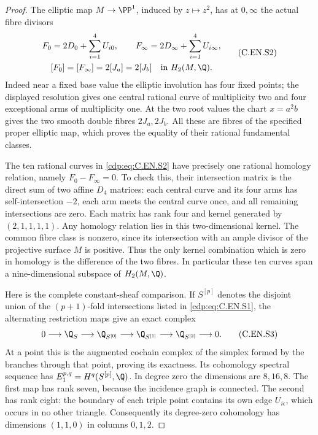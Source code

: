 \begin{proof}
The elliptic map $M\to\PP^1$, induced by $z\mapsto z^2$,
has at $0,\infty$ the actual fibre divisors
\[
 \begin{gathered}
 F_0=2D_0+\sum_{i=1}^4U_{i0},\qquad
 F_\infty=2D_\infty+\sum_{i=1}^4U_{i\infty},\\
 [F_0]=[F_\infty]=2[J_a]=2[J_b]
       \quad\text{in }H_2(M,\Q).
 \end{gathered}                                          \tag{C.EN.S2}\label{cdp:eq:C.EN.S2}
\]
Indeed near a fixed base value the elliptic involution has
four fixed points; the displayed resolution gives one central
rational curve of multiplicity two and four exceptional arms
of multiplicity one. At the two root values the chart
$x=a^2b$ gives the two smooth double fibres $2J_a,2J_b$.
All these are fibres of the specified proper elliptic map,
which proves the equality of their rational fundamental classes.

The ten rational curves in \eqref{cdp:eq:C.EN.S2} have precisely one rational
homology relation, namely $F_0-F_\infty=0$. To check this,
their intersection matrix is the direct sum of two affine
$D_4$ matrices: each central curve and its four arms has
self-intersection $-2$, each arm meets the central curve
once, and all remaining intersections are zero. Each matrix
has rank four and kernel generated by $(2,1,1,1,1)$.
Any homology relation lies in this two-dimensional kernel.
The common fibre class is nonzero, since its intersection
with an ample divisor of the projective surface $M$ is
positive. Thus the only kernel combination which is zero in
homology is the difference of the two fibres. In particular
these ten curves span a nine-dimensional subspace of
$H_2(M,\Q)$.

Here is the complete constant-sheaf comparison. If $S^{[p]}$
denotes the disjoint union of the $(p+1)$-fold intersections
listed in \eqref{cdp:eq:C.EN.S1}, the alternating restriction maps give
an exact complex
\[
 0\longrightarrow\Q_S\longrightarrow\Q_{S^{[0]}}
 \longrightarrow\Q_{S^{[1]}}
 \longrightarrow\Q_{S^{[2]}}\longrightarrow0.           \tag{C.EN.S3}\label{cdp:eq:C.EN.S3}
\]
At a point this is the augmented cochain complex of the
simplex formed by the branches through that point, proving
its exactness. Its cohomology spectral sequence has
$E_1^{p,q}=H^q(S^{[p]},\Q)$.
In degree zero the dimensions are $8,16,8$. The first
map has rank seven, because the incidence graph is connected.
The second has rank eight: the boundary of each triple
point contains its own edge $U_{i\epsilon}$, which occurs
in no other triangle. Consequently its degree-zero cohomology
has dimensions $(1,1,0)$ in columns $0,1,2$.


\end{proof}
